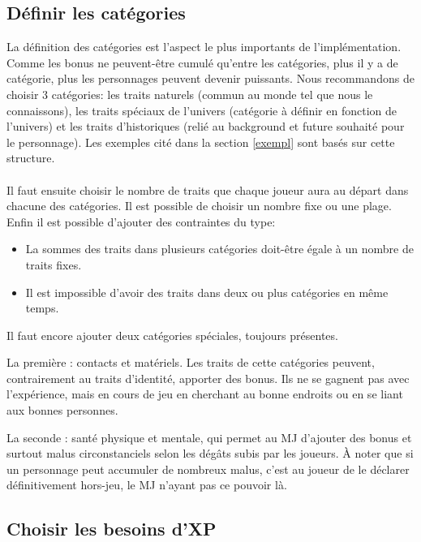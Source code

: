 \documentclass[a4paper,10pt,twoside,twocolumn]{article}
\begin{document}
 \subsection{Définir les catégories}
 \label{implem::cat}
 
 La définition des catégories est l'aspect le plus importants de l'implémentation. Comme les bonus ne peuvent-être cumulé qu'entre les catégories, plus il y a de catégorie, plus les personnages peuvent devenir puissants. Nous recommandons de choisir 3 catégories: les traits naturels (commun au monde tel que nous le connaissons), les traits spéciaux de l'univers (catégorie à définir en fonction de l'univers) et les traits d'historiques (relié au background et future souhaité pour le personnage). Les exemples cité dans la section \ref{exempl} sont basés sur cette structure.\\
 \\
 Il faut ensuite choisir le nombre de traits que chaque joueur aura au départ dans chacune des catégories. Il est possible de choisir un nombre fixe ou une plage. Enfin il est possible d'ajouter des contraintes du type:
 
 \begin{itemize}
  \item La sommes des traits dans plusieurs catégories doit-être égale à un nombre de traits fixes.
  \item Il est impossible d'avoir des traits dans deux ou plus catégories en même temps.
 \end{itemize}

 Il faut encore ajouter deux catégories spéciales, toujours présentes.
 
 La première : contacts et matériels. Les traits de cette catégories peuvent, contrairement au traits d'identité, apporter des bonus. Ils ne se gagnent pas avec l'expérience, mais en cours de jeu en cherchant au bonne endroits ou en se liant aux bonnes personnes.
 
 La seconde : santé physique et mentale, qui permet au MJ d'ajouter des bonus et surtout malus circonstanciels selon les dégâts subis par les joueurs. À noter que si un personnage peut accumuler de nombreux malus, c'est au joueur de le déclarer définitivement hors-jeu, le MJ n'ayant pas ce pouvoir là.
 
 \subsection{Choisir les besoins d'XP}
 \label{implem::cat}
 
\end{document}
